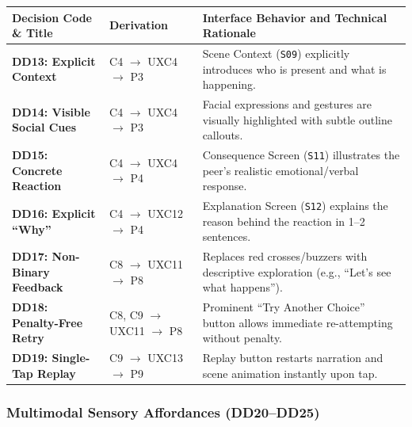 \begin{xltabular}{\textwidth}{|p{3.5cm}|p{2.5cm}|X|}
\hline
\textbf{Decision Code \& Title} & \textbf{Derivation} & \textbf{Interface Behavior and Technical Rationale} \\ \hline
\endhead
\textbf{DD13: Explicit Context} & C4 $\rightarrow$ UXC4 $\rightarrow$ P3 & Scene Context (\texttt{S09}) explicitly introduces who is present and what is happening. \\ \hline
\textbf{DD14: Visible Social Cues} & C4 $\rightarrow$ UXC4 $\rightarrow$ P3 & Facial expressions and gestures are visually highlighted with subtle outline callouts. \\ \hline
\textbf{DD15: Concrete Reaction} & C4 $\rightarrow$ UXC4 $\rightarrow$ P4 & Consequence Screen (\texttt{S11}) illustrates the peer's realistic emotional/verbal response. \\ \hline
\textbf{DD16: Explicit ``Why''} & C4 $\rightarrow$ UXC12 $\rightarrow$ P4 & Explanation Screen (\texttt{S12}) explains the reason behind the reaction in 1--2 sentences. \\ \hline
\textbf{DD17: Non-Binary Feedback} & C8 $\rightarrow$ UXC11 $\rightarrow$ P8 & Replaces red crosses/buzzers with descriptive exploration (e.g., ``Let's see what happens''). \\ \hline
\textbf{DD18: Penalty-Free Retry} & C8, C9 $\rightarrow$ UXC11 $\rightarrow$ P8 & Prominent ``Try Another Choice'' button allows immediate re-attempting without penalty. \\ \hline
\textbf{DD19: Single-Tap Replay} & C9 $\rightarrow$ UXC13 $\rightarrow$ P9 & Replay button restarts narration and scene animation instantly upon tap. \\ \hline
\end{xltabular}
\label{tab:c5_dd_feedback}

\subsubsection{Multimodal Sensory Affordances (DD20--DD25)}

